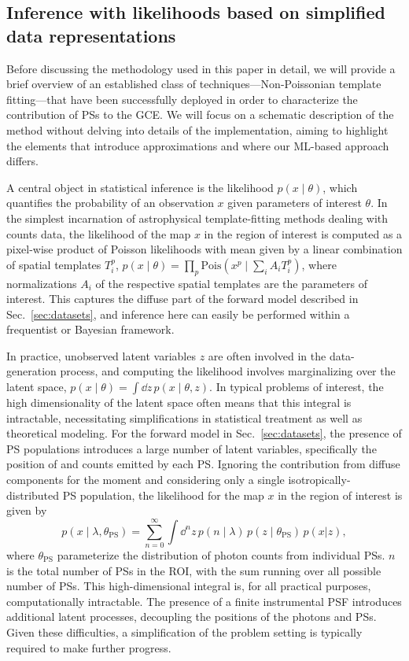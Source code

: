 \documentclass[prd,aps,10pt,nofootinbib,twocolumn,superscriptaddress,preprintnumbers,balancelastpage,longbibliography,floatfix]{revtex4-2}
\begin{document}
\subsection{Inference with likelihoods based on simplified data representations}
\label{sec:likelihood-methods}

Before discussing the methodology used in this paper in detail, we will provide a brief overview of an established class of techniques---Non-Poissonian template fitting---that have been successfully deployed in order to characterize the contribution of PSs to the GCE. 
We will focus on a schematic description of the method without delving into details of the implementation, aiming to highlight the elements that introduce approximations and where our ML-based approach differs.

A central object in statistical inference is the likelihood $p(x\mid \theta)$, which quantifies the probability of an observation $x$ given parameters of interest $\theta$. In the simplest incarnation of astrophysical template-fitting methods dealing with counts data, the likelihood of the map $x$ in the region of interest is computed as a pixel-wise product of Poisson likelihoods with mean given by a linear combination of spatial templates $T_i^p$, $p(x\mid \theta) = \prod_p \mathrm{Pois}\left(x^p\mid\sum_i A_i T_i^p\right)$, where normalizations $A_i$ of the respective spatial templates are the parameters of interest. This captures the diffuse part of the forward model described in Sec.~\ref{sec:datasets}, and inference here can easily be performed within a frequentist or Bayesian framework. 

In practice, unobserved latent variables $z$ are often involved in the data-generation process, and computing the likelihood involves marginalizing over the latent space, $p(x\mid\theta) = \int \dd z\,p(x\mid\theta, z)$. In typical problems of interest, the high dimensionality of the latent space often means that this integral is intractable, necessitating simplifications in statistical treatment as well as theoretical modeling. 
For the forward model in Sec.~\ref{sec:datasets}, the presence of PS populations 
introduces a large number of latent variables, specifically the position of and counts emitted by each PS. Ignoring the contribution from diffuse components for the moment and considering only a single isotropically-distributed PS population, the likelihood for the map $x$ in the region of interest is given by
\begin{equation}
\label{eq:data_likelihood}
p(x\mid\lambda, \theta_\mathrm{PS}) = \sum_{n = 0}^{\infty} \int \dd^{n} z \, p\left(n\mid\lambda\right)\,p(z\mid\theta_\mathrm{PS})\,p(x|z),
\end{equation}
where $\theta_\mathrm{PS}$ parameterize the distribution of photon counts from individual PSs. $n$ is the total number of PSs in the ROI, with the sum running over all possible number of PSs. This high-dimensional integral is, for all practical purposes, computationally intractable. The presence of a finite instrumental PSF introduces additional latent processes, decoupling the positions of the photons and PSs. Given these difficulties, a simplification of the problem setting is typically required to make further progress.
\end{document}
